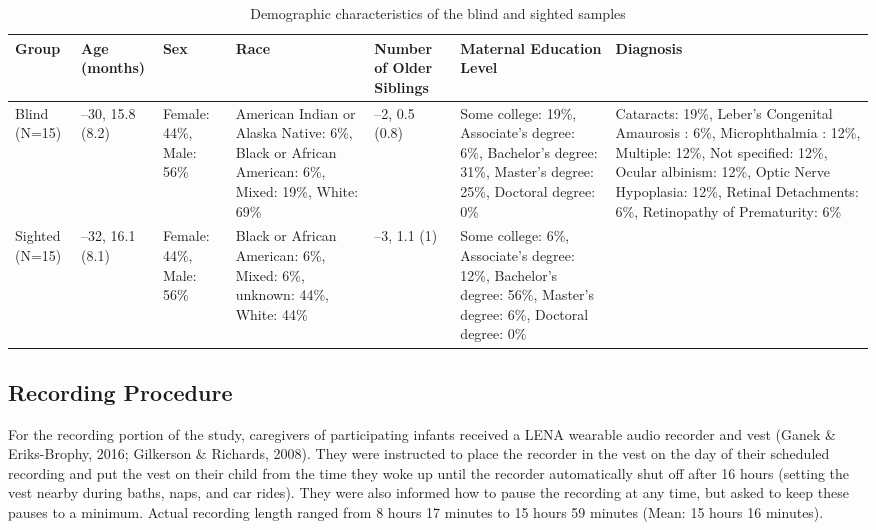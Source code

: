 \documentclass[
  man,floatsintext]{apa6}
\begin{document}
\begin{table}

\caption{\label{tab:participant-characteristics}Demographic characteristics of the blind and sighted samples}
\centering
\fontsize{8}{10}\selectfont
\begin{tabular}[t]{>{\raggedright\arraybackslash}p{.4in}|>{\raggedright\arraybackslash}p{.5in}|>{\raggedright\arraybackslash}p{.7in}|>{\raggedright\arraybackslash}p{.75in}|>{\raggedright\arraybackslash}p{.75in}|>{\raggedright\arraybackslash}p{1in}|>{\raggedright\arraybackslash}p{1.5in}}
\hline
Group & Age (months) & Sex & Race & Number of Older Siblings & Maternal Education Level & Diagnosis\\
\hline
Blind (N=15) & 6--30,
15.8 (8.2) & Female: 44\%,
Male: 56\% & American Indian or Alaska Native: 6\%,
Black or African American: 6\%,
Mixed: 19\%,
White: 69\% & 0--2,
0.5 (0.8) & Some college: 19\%,
Associate's degree: 6\%,
Bachelor's degree: 31\%,
Master's degree: 25\%,
Doctoral degree: 0\% & Cataracts: 19\%,
Leber's Congenital Amaurosis : 6\%,
Microphthalmia : 12\%,
Multiple: 12\%,
Not specified: 12\%,
Ocular albinism: 12\%,
Optic Nerve Hypoplasia: 12\%,
Retinal Detachments: 6\%,
Retinopathy of Prematurity: 6\%\\
\hline
Sighted (N=15) & 6--32,
16.1 (8.1) & Female: 44\%,
Male: 56\% & Black or African American: 6\%,
Mixed: 6\%,
unknown: 44\%,
White: 44\% & 0--3,
1.1 (1) & Some college: 6\%,
Associate's degree: 12\%,
Bachelor's degree: 56\%,
Master's degree: 6\%,
Doctoral degree: 0\% & \\
\hline
\end{tabular}
\end{table}

\hypertarget{recording-procedure}{%
\subsection{Recording Procedure}\label{recording-procedure}}

For the recording portion of the study, caregivers of participating infants received a LENA wearable audio recorder and vest (Ganek \& Eriks-Brophy, 2016; Gilkerson \& Richards, 2008). They were instructed to place the recorder in the vest on the day of their scheduled recording and put the vest on their child from the time they woke up until the recorder automatically shut off after 16 hours (setting the vest nearby during baths, naps, and car rides). They were also informed how to pause the recording at any time, but asked to keep these pauses to a minimum. Actual recording length ranged from 8 hours 17 minutes to 15 hours 59 minutes (Mean: 15 hours 16 minutes).
\end{document}
